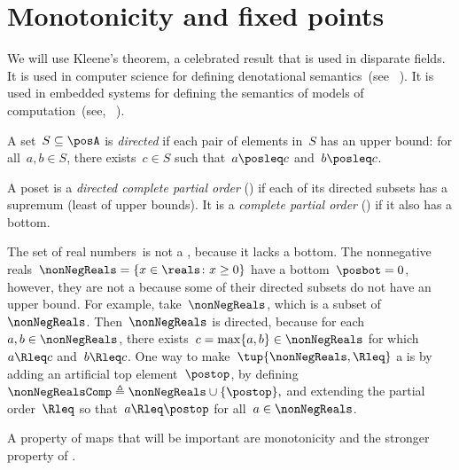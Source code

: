 

\section{Monotonicity and fixed points}
\label{sec:Monotonicity-and-fixed}

We will use Kleene's theorem, a celebrated result that is used in
disparate fields.
It is used in computer science for defining denotational
semantics~(see \eg~\cite{manes86}).
It is used in embedded systems
for defining the semantics of models of computation~(see, \eg~\cite{lee10}).

\begin{definition}
    \label{def:directed-set}
    A set~$S\subseteq\posA$ is \emph{directed} if each pair of elements
    in~$S$ has an upper bound: for all~$a,b\in S$, there exists~$c\in S$
    such that~$a\posleq c$ and~$b\posleq c$.
\end{definition}

\begin{definition}[Completeness]
    \label{def:cpo}A poset is a \emph{directed complete partial order}
    (\DCPO) if each of its directed subsets has a supremum (least of
    upper bounds).
It is a \emph{complete partial order} (\CPO) if it
    also has a bottom.

\end{definition}
\begin{example}
    \label{exa:Rcomp}The set of real numbers~\reals is not
    a \CPO, because it lacks a bottom.
The nonnegative reals~$\nonNegReals=\{x\in\reals \colon x\geq0\}$
    have a bottom~$\posbot=0$, however, they are not a \DCPO because some
    of their directed subsets do not have an upper bound.
For example,
    take~$\nonNegReals$, which is a subset of~$\nonNegReals$.
Then~$\nonNegReals$
    is directed, because for each~$a,b\in\nonNegReals$, there exists~$c=\max\{a,b\}\in\nonNegReals$
    for which~$a\Rleq c$ and~$b\Rleq c$.
One way to make~$\tup{ \nonNegReals,\Rleq} $
    a \CPO is by adding an artificial top element~$\postop$, by defining~$\nonNegRealsComp\triangleq\nonNegReals\cup\{\postop\},$
    and extending the partial order~$\Rleq$ so that~$a\Rleq\postop$ for
    all~$a\in\nonNegReals$.
\end{example}

A property of maps that will be important are monotonicity and
the stronger property of \scottcontinuity.

